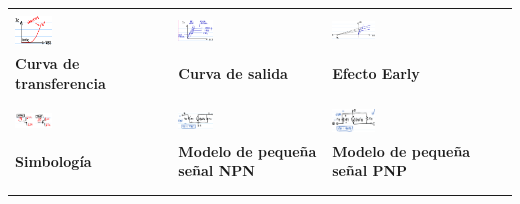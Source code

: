 \documentclass[11pt]{article}
\begin{document}
	\begin{table}
		\centering
		\begin{tabular}{|p{}|p{}|p{}|}
			\hline
			&\\
			\includegraphics[width=0.25\textwidth, keepaspectratio]{transfer}
			& \includegraphics[width=0.25\textwidth, keepaspectratio]{output}
			& \includegraphics[width=0.25\textwidth, keepaspectratio]{early} \\
			\textbf{Curva de transferencia} & \textbf{Curva de salida} & \textbf{Efecto Early} \\
			&\\
			\hline
			&\\
			\includegraphics[width=0.25\textwidth, keepaspectratio]{simbologia}
			& \includegraphics[width=0.25\textwidth, keepaspectratio]{smallsignal-npn}
			& \includegraphics[width=0.25\textwidth, keepaspectratio]{smallsignal-pnp} \\
			\textbf{Simbología} & \textbf{Modelo de pequeña señal NPN} & \textbf{Modelo de pequeña señal PNP} \\
			&\\
			\hline
			&\\

\end{tabular}
\end{table}
\end{document}
